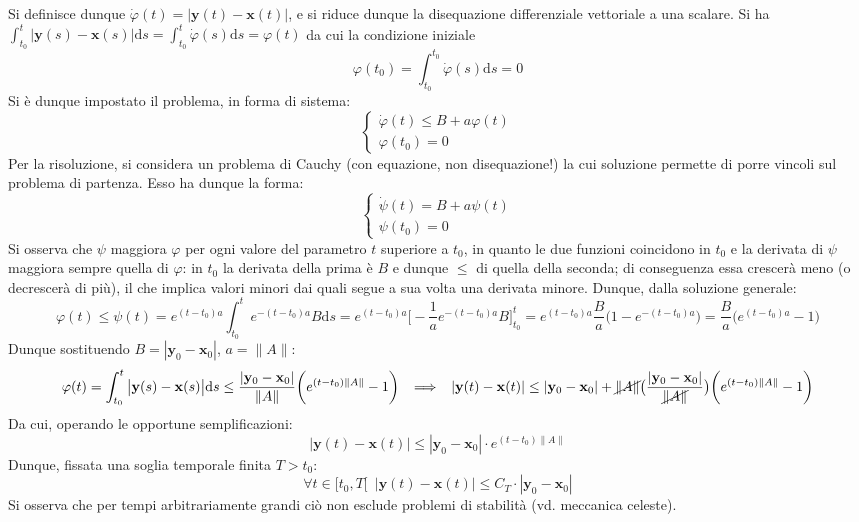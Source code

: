 \documentclass[10pt, oneside]{book}
\theoremstyle{plain}
\begin{document}
Si definisce dunque $\displaystyle \dot{\varphi}(t) = \big|\mathbf{y}(t) - \mathbf{x}(t)\big|$, e si riduce dunque la disequazione differenziale vettoriale a una scalare. Si ha $\displaystyle \int_{t_0}^{t} \big| \mathbf{y}(s) - \mathbf{x}(s)\big| \textrm{d}s = \int_{t_0}^{t} \dot{\varphi}(s)\textrm{d}s = \varphi(t)$ da cui la condizione iniziale
\[\varphi(t_0) = \int_{t_0}^{t_0} \dot{\varphi}(s) \textrm{d}s = 0\]
Si è dunque impostato il problema, in forma di sistema:
\[\begin{cases}
\dot{\varphi}(t) \leq B + a \varphi(t)\\
\varphi(t_0) = 0
\end{cases}\]
Per la risoluzione, si considera un problema di Cauchy (con equazione, non disequazione!) la cui soluzione permette di porre vincoli sul problema di partenza. Esso ha dunque la forma:
\[\begin{cases}
\dot{\psi}(t) = B + a \psi(t)\\
\psi(t_0) = 0
\end{cases}\]
Si osserva che $\psi$ maggiora $\varphi$ per ogni valore del parametro $t$ superiore a $t_0$, in quanto le due funzioni coincidono in $t_0$ e la derivata di $\psi$ maggiora sempre quella di $\varphi$: in $t_0$ la derivata della prima è $B$ e dunque $\leq$ di quella della seconda; di conseguenza essa crescerà meno (o decrescerà di più), il che implica valori minori dai quali segue a sua volta una derivata minore. Dunque, dalla soluzione generale:
\[\varphi(t) \leq \psi(t) = e^{(t - t_0) a} \int_{t_0}^{t}e^{- (t - t_0) a}B \textrm{d}s = e^{(t - t_0) a} \bigg[-\frac{1}{a}e^{- (t - t_0) a} B\bigg]_{t_0}^t = e^{(t - t_0) a} \frac{B}{a} \big(1 - e^{- (t - t_0) a}\big) = \frac{B}{a}\big(e^{(t - t_0) a} - 1\big)\]
Dunque sostituendo $\displaystyle B = |\mathbf{y}_0 - \mathbf{x}_0|$, $a = \|A\|$:
\[\varphi(t) = \int_{t_0}^{t} \big| \mathbf{y}(s) - \mathbf{x}(s)\big| \textrm{d}s \leq \frac{|\mathbf{y}_0 - \mathbf{x}_0|}{\|A\|} \bigg(e^{(t - t_0) \|A\|} - 1\bigg) \enspace \implies \enspace |\mathbf{y}(t) - \mathbf{x}(t)| \leq |\mathbf{y}_0 - \mathbf{x}_0| + \cancel{\|A\|} \big(\frac{|\mathbf{y}_0 - \mathbf{x}_0|}{\cancel{\|A\|}}\big)\bigg(e^{(t - t_0) \|A\|} - 1\bigg)\]
Da cui, operando le opportune semplificazioni:
\[|\mathbf{y}(t) - \mathbf{x}(t)| \leq |\mathbf{y}_0 - \mathbf{x}_0| \cdot e^{(t - t_0) \|A\|}\]
Dunque, fissata una soglia temporale finita $T > t_0$:
\[\forall t \in [t_0, T[ \enspace |\mathbf{y}(t) - \mathbf{x}(t)| \leq C_T \cdot |\mathbf{y}_0 - \mathbf{x}_0|\]
Si osserva che per tempi arbitrariamente grandi ciò non esclude problemi di stabilità (vd. meccanica celeste).
\end{document}
